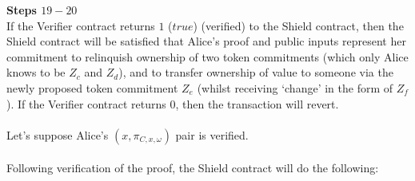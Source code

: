 \textbf{Steps $19 - 20$}
\ \\
If the Verifier contract returns $1$ ($true$) (verified) to the Shield contract, then the Shield contract will be satisfied that Alice's proof and public inputs represent her commitment to relinquish ownership of two token commitments (which only Alice knows to be $Z_c$ and $Z_d$), and to transfer ownership of value to someone via the newly proposed token commitment $Z_e$ (whilst receiving `change' in the form of $Z_f$). If the Verifier contract returns $0$, then the transaction will revert.\\
\\
Let's suppose Alice's $(x, \pi_{C,x,\omega})$ pair is verified.\\
\\
Following verification of the proof, the Shield contract will do the following:
